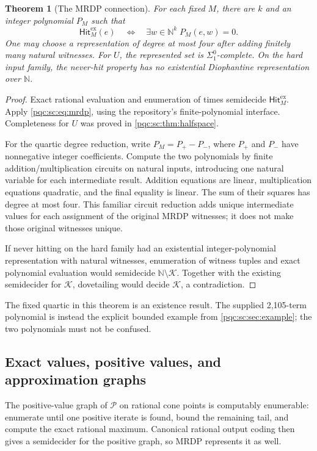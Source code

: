 \documentclass[11pt,letterpaper]{article}
\numberwithin{equation}{section}
\newtheorem{theorem}{Theorem}[section]
\theoremstyle{definition}
\theoremstyle{remark}
\newcommand{\N}{\mathbb N}
\newcommand{\Peak}{\mathcal P}
\newcommand{\HitEx}{\mathsf{Hit}^{\mathrm{ex}}}
\begin{document}
\begin{theorem}[The MRDP connection]\label{pqc:sc:thm:dioph}
For each fixed $M$, there are $k$ and an integer polynomial $P_M$ such that
\begin{equation}\label{pqc:sc:eq:hitmrdp}
 \HitEx_M(e)\quad\Longleftrightarrow\quad
 \exists w\in\N^k\;P_M(e,w)=0.
\end{equation}
One may choose a representation of degree at most four after adding
finitely many natural witnesses. For $U$, the represented set is
$\Sigma^0_1$-complete. On the hard input family, the never-hit property
has no existential Diophantine representation over $\N$.
\end{theorem}
\begin{proof}
Exact rational evaluation and enumeration of times semidecide $\HitEx_M$.
Apply \eqref{pqc:sc:eq:mrdp}, using the repository's finite-polynomial interface.
Completeness for $U$ was proved in \cref{pqc:sc:thm:halfspace}.

For the quartic degree reduction, write $P_M=P_+-P_-$, where $P_+$ and
$P_-$ have nonnegative integer coefficients. Compute the two polynomials
by finite addition/multiplication circuits on natural inputs, introducing
one natural variable for each intermediate result. Addition equations are
linear, multiplication equations quadratic, and the final equality is
linear. The sum of their squares has degree at most four. This familiar
circuit reduction adds unique intermediate values for each assignment of
the original MRDP witnesses; it does not make those original witnesses
unique.

If never hitting on the hard family had an existential integer-polynomial
representation with natural witnesses, enumeration of witness tuples and
exact polynomial evaluation would semidecide $\N\setminus\mathcal K$.
Together with the existing semidecider for $\mathcal K$, dovetailing would
decide $\mathcal K$, a contradiction.
\end{proof}

The fixed quartic in this theorem is an existence result. The supplied
2,105-term polynomial is instead the explicit bounded example from
\cref{pqc:sc:sec:example}; the two polynomials must not be confused.

\subsection{Exact values, positive values, and approximation graphs}

The positive-value graph of $\Peak$ on rational cone points is computably
enumerable: enumerate until one positive iterate is found, bound the
remaining tail, and compute the exact rational maximum. Canonical rational
output coding then gives a semidecider for the positive graph, so MRDP
represents it as well.
\end{document}
